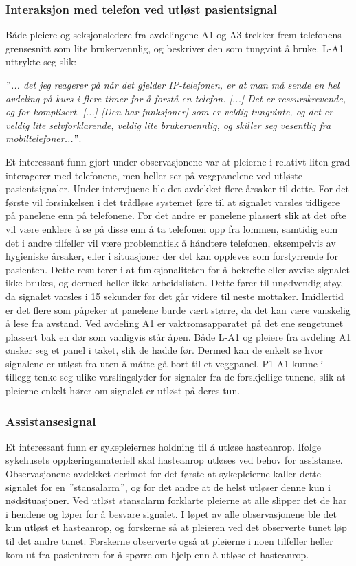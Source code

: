 \subsubsection{Interaksjon med telefon ved utløst pasientsignal}
Både pleiere og seksjonsledere fra avdelingene A1 og A3 trekker frem telefonens grensesnitt som lite brukervennlig, og beskriver den som tungvint å bruke. L-A1 uttrykte seg slik:

\noindent
\textit{ $"$... det jeg reagerer på når det gjelder IP-telefonen, er at man må sende en hel avdeling på kurs i flere timer for å forstå en telefon. [...] Det er ressurskrevende, og for komplisert. [...] [Den har funksjoner] som er veldig tungvinte, og det er veldig lite selvforklarende, veldig lite brukervennlig, og skiller seg vesentlig fra mobiltelefoner...$"$}.

\noindent
Et interessant funn gjort under observasjonene var at pleierne i relativt liten grad interagerer med telefonene, men heller ser på veggpanelene ved utløste pasientsignaler. Under intervjuene ble det avdekket flere årsaker til dette. For det første vil forsinkelsen i det trådløse systemet føre til at signalet varsles tidligere på panelene enn på telefonene. For det andre er panelene plassert slik at det ofte vil være enklere å se på disse enn å ta telefonen opp fra lommen, samtidig som det i andre tilfeller vil være problematisk å håndtere telefonen, eksempelvis av hygieniske årsaker, eller i situasjoner der det kan oppleves som forstyrrende for pasienten. Dette resulterer i at funksjonaliteten for å bekrefte eller avvise signalet ikke brukes, og dermed heller ikke arbeidslisten. Dette fører til unødvendig støy, da signalet varsles i 15 sekunder før det går videre til neste mottaker. Imidlertid er det flere som påpeker at panelene burde vært større, da det kan være vanskelig å lese fra avstand. Ved avdeling A1 er vaktromsapparatet på det ene sengetunet plassert bak en dør som vanligvis står åpen. Både L-A1 og pleiere fra avdeling A1 ønsker seg et panel i taket, slik de hadde før. Dermed kan de enkelt se hvor signalene er utløst fra uten å måtte gå bort til et veggpanel. P1-A1 kunne i tillegg tenke seg ulike varslingslyder for signaler fra de forskjellige tunene, slik at pleierne enkelt hører om signalet er utløst på deres tun.

\subsubsection{Assistansesignal}
Et interessant funn er sykepleiernes holdning til å utløse hasteanrop. Ifølge sykehusets opplæringsmateriell skal hasteanrop utløses ved behov for assistanse. Observasjonene avdekket derimot for det første at sykepleierne kaller dette signalet for en $"$stansalarm$"$, og for det andre at de helst utløser denne kun i nødsituasjoner. Ved utløst stansalarm forklarte pleierne at alle slipper det de har i hendene og løper for å besvare signalet. I løpet av alle observasjonene ble det kun utløst et hasteanrop, og forskerne så at pleieren ved det observerte tunet løp til det andre tunet. Forskerne observerte også at pleierne i noen tilfeller heller kom ut fra pasientrom for å spørre om hjelp enn å utløse et hasteanrop. 


